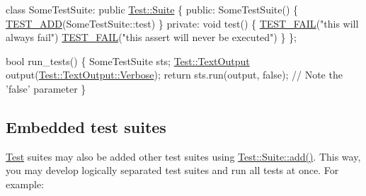 \begin{DoxyCode}
\textcolor{keyword}{class }SomeTestSuite: \textcolor{keyword}{public} \hyperlink{class_test_1_1_suite}{Test::Suite}
\{
\textcolor{keyword}{public}:
    SomeTestSuite() \{ \hyperlink{cpptest-suite_8h_abe8c3e0a2cf3893ebc1c265264ed9cb8}{TEST\_ADD}(SomeTestSuite::test) \}
\textcolor{keyword}{private}:
    \textcolor{keywordtype}{void} test()
    \{
        \hyperlink{cpptest-assert_8h_a947ab44cc42369eb7cfe33f8a1e38e4b}{TEST\_FAIL}(\textcolor{stringliteral}{"this will always fail"})
        \hyperlink{cpptest-assert_8h_a947ab44cc42369eb7cfe33f8a1e38e4b}{TEST\_FAIL}("this assert will never be executed")
    \}
\};

\textcolor{keywordtype}{bool} run\_tests()
\{
    SomeTestSuite sts;
    \hyperlink{class_test_1_1_text_output}{Test::TextOutput} output(\hyperlink{class_test_1_1_text_output_ae7b22c9458e6c566996bf4517c73feb1a85dd6e42f6261a23fd504201f5cc2792}{Test::TextOutput::Verbose});
    \textcolor{keywordflow}{return} sts.run(output, \textcolor{keyword}{false}); \textcolor{comment}{// Note the 'false' parameter}
\}
\end{DoxyCode}
\hypertarget{tutorial_tutorial_embedded_test_suites}{}\subsection{Embedded test suites}\label{tutorial_tutorial_embedded_test_suites}
\hyperlink{namespace_test}{Test} suites may also be added other test suites using \hyperlink{class_test_1_1_suite_a0237b63fc694ecb133d023cf2d6ab271}{Test\+::\+Suite\+::add()}. This way, you may develop logically separated test suites and run all tests at once. For example\+:


